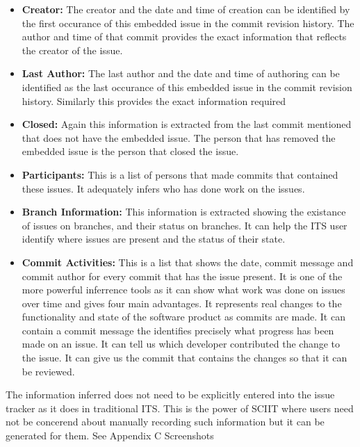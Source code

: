 \documentclass{mproj}
\begin{document}
\begin{itemize}
    \item \textbf{Creator:} The creator and the date and time of creation can be identified by the first occurance of this embedded issue in the commit revision history. The author and time of that commit provides the exact information that reflects the creator of the issue.
    \item \textbf{Last Author:} The last author and the date and time of authoring can be identified as the last occurance of this embedded issue in the commit revision history. Similarly this provides the exact information required
    \item \textbf{Closed:} Again this information is extracted from the last commit mentioned that does not have the embedded issue. The person that has removed the embedded issue is the person that closed the issue.
    \item \textbf{Participants:} This is a list of persons that made commits that contained these issues. It adequately infers who has done work on the issues.
    \item \textbf{Branch Information:} This information is extracted showing the existance of issues on branches, and their status on branches. It can help the ITS user identify where issues are present and the status of their state.
    \item \textbf{Commit Activities:} This is a list that shows the date, commit message and commit author for every commit that has the issue present. It is one of the more powerful inferrence tools as it can show what work was done on issues over time and gives four main advantages. It represents real changes to the functionality and state of the software product as commits are made. It can contain a commit message the identifies precisely what progress has been made on an issue. It can tell us which developer contributed the change to the issue. It can give us the commit that contains the changes so that it can be reviewed.
\end{itemize}

The information inferred does not need to be explicitly entered into the issue tracker as it does in traditional ITS. This is the power of SCIIT where users need not be concerend about manually recording such information but it can be generated for them. See Appendix C Screenshots %
\end{document}
